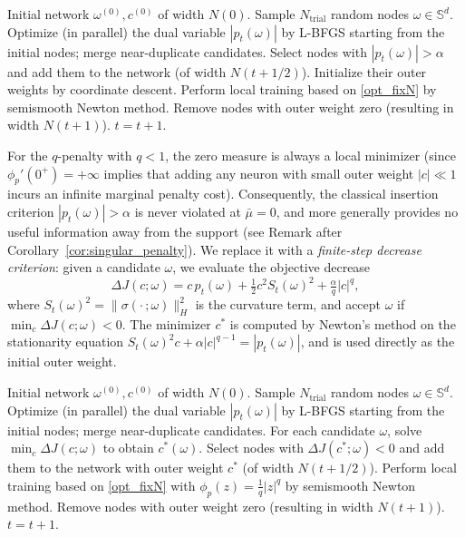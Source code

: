 \documentclass[12pt,fleqn]{amsart}
\theoremstyle{definition}
\begin{document}
\begin{algorithm}[H]
\caption{Iterative node insertion and optimization with $\phi_{\log,\gamma}$-penalty}
\label{alg:log}
\begin{algorithmic}[1]
\STATE Initial network $\omega^{(0)}, c^{(0)}$ of width $N(0)$.
\STATE Sample $N_{\mathrm{trial}}$ random nodes $\omega \in \mathbb{S}^d$.
\STATE Optimize (in parallel) the dual variable $|p_t(\omega)|$ by L-BFGS starting from the initial nodes; merge near-duplicate candidates.
\STATE Select nodes with $|p_t(\omega)| > \alpha$ and add them to the network (of width $N(t + 1/2)$). Initialize their outer weights by coordinate descent.
\STATE Perform local training based on \eqref{opt_fixN} by semismooth Newton method.
\STATE Remove nodes with outer weight zero (resulting in width $N(t+1)$).
\STATE $t = t + 1$.
\ENDWHILE
\end{algorithmic}
\end{algorithm}

For the $q$-penalty with $q < 1$, the zero measure is always a local minimizer
(since $\phi_p'(0^+) = +\infty$ implies that adding any neuron with small outer weight $|c| \ll 1$
incurs an infinite marginal penalty cost).
Consequently, the classical insertion criterion $|p_t(\omega)| > \alpha$ is never violated at $\bar{\mu} = 0$,
and more generally provides no useful information away from the support (see Remark after Corollary~\ref{cor:singular_penalty}).
We replace it with a \emph{finite-step decrease criterion}:
given a candidate $\omega$, we evaluate the objective decrease
\[
	\Delta J(c; \omega) = c \, p_t(\omega) + \tfrac{1}{2} c^2 S_t(\omega)^2 + \tfrac{\alpha}{q} |c|^q,
\]
where $S_t(\omega)^2 = \|\sigma(\cdot\,; \omega)\|_H^2$ is the curvature term,
and accept $\omega$ if $\min_c \Delta J(c; \omega) < 0$.
The minimizer $c^*$ is computed by Newton's method on the stationarity equation
$S_t(\omega)^2 c + \alpha |c|^{q-1} = |p_t(\omega)|$,
and is used directly as the initial outer weight.

\begin{algorithm}[H]
\caption{Iterative node insertion and optimization with $|c|^q$-penalty}
\label{alg:q}
\begin{algorithmic}[1]
\STATE Initial network $\omega^{(0)}, c^{(0)}$ of width $N(0)$.
\STATE Sample $N_{\mathrm{trial}}$ random nodes $\omega \in \mathbb{S}^d$.
\STATE Optimize (in parallel) the dual variable $|p_t(\omega)|$ by L-BFGS starting from the initial nodes; merge near-duplicate candidates.
\STATE For each candidate $\omega$, solve $\min_c \Delta J(c; \omega)$ to obtain $c^*(\omega)$. Select nodes with $\Delta J(c^*; \omega) < 0$ and add them to the network with outer weight $c^*$ (of width $N(t + 1/2)$).
\STATE Perform local training based on \eqref{opt_fixN} with $\phi_p(z) = \frac{1}{q}|z|^q$ by semismooth Newton method.
\STATE Remove nodes with outer weight zero (resulting in width $N(t+1)$).
\STATE $t = t + 1$.
\ENDWHILE
\end{algorithmic}
\end{algorithm}
\end{document}
